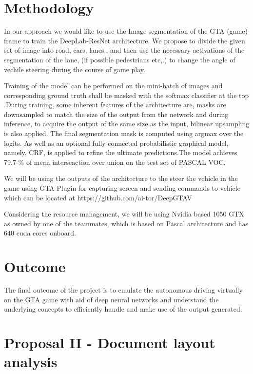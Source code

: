 \documentclass[10pt,twocolumn,letterpaper]{article}
\begin{document}
\section{Methodology}
   In our approach we would like to use the Image segmentation of the GTA (game) frame to train the DeepLab-ResNet architecture. We propose to divide the given set of image into road, cars, lanes., and then use the 
 necessary activations of the segmentation of the lane, (if possible pedestrians etc,.) to change the angle of vechile steering during the course of game play.

Training of the model can be performed on the mini-batch of images and corresponding ground truth shall be masked with the softmax classifier at the top .During training, some inherent features of the architecture are, masks are downsampled to match the size of the output from the network and during inference, to acquire the output of the same size as the input, bilinear upsampling is also applied. The final segmentation mask is computed using argmax over the logits. As well as an optional fully-connected probabilistic graphical model, namely, CRF, is applied to refine the ultimate predictions.The model achieves 79.7 \% of mean interseaction over union on the test set of PASCAL VOC. 

We will be using the outputs of the architecture to the steer the vehicle in the game using GTA-Plugin for capturing screen and sending commands to vehicle which can be located at https://github.com/ai-tor/DeepGTAV

Considering the resource management, we will be using Nvidia based 1050 GTX as owned by one of the teammates, which is based on Pascal architecture and has 640 cuda cores onboard.

\section{Outcome}
   The final outcome of the project is to emulate the autonomous driving virtually on the GTA game with aid of deep neural networks and understand the underlying concepts to efficiently handle and make use of the output generated.  

%
%
\section*{Proposal II - Document layout analysis}
\setcounter{section}{0}
\end{document}
